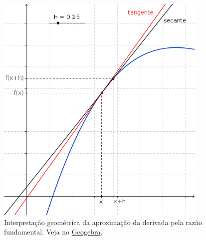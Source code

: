 \begin{figure}[h]
  \centering
  \includegraphics[width=0.9\textwidth]{cap_deriv/dados/fig_intro_deriv/fig_intro_deriv}
  \caption{Interpretação geométrica da aproximação da derivada pela razão fundamental. Veja no \href{https://github.com/phkonzen/notas/blob/master/src/MatematicaNumerica/cap_deriv/dados/fig_intro_deriv/fig_intro_deriv.ggb}{Geogebra}.}
  \label{fig:intro_deriv}
\end{figure}

